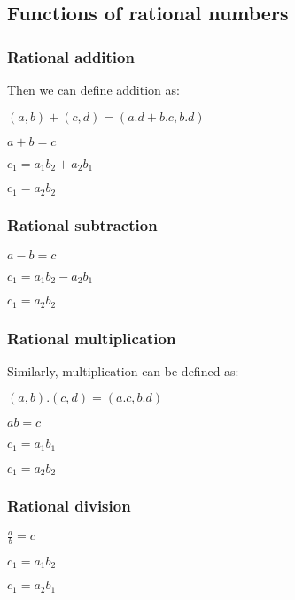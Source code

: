 \subsection{Functions of rational numbers}

\subsubsection{Rational addition}

Then we can define addition as:

$(a,b)+(c,d)=(a.d+b.c,b.d)$

$a+b=c$

$c_1=a_1b_2+a_2b_1$

$c_1=a_2b_2$

\subsubsection{Rational subtraction}

$a-b=c$

$c_1=a_1b_2-a_2b_1$

$c_1=a_2b_2$

\subsubsection{Rational multiplication}

Similarly, multiplication can be defined as:

$(a,b).(c,d)=(a.c, b.d)$

$ab=c$

$c_1=a_1b_1$

$c_1=a_2b_2$

\subsubsection{Rational division}

$\frac{a}{b}=c$

$c_1=a_1b_2$

$c_1=a_2b_1$

